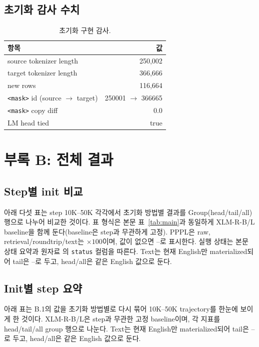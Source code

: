 \documentclass[11pt,a4paper]{article}
\begin{document}
\subsection{초기화 감사 수치}
\begin{table}[h]\centering\small
\caption{초기화 구현 감사.}
\label{tab:audit}
\begin{tabular}{@{}lr@{}}
\toprule
항목 & 값 \\
\midrule
source tokenizer length & 250{,}002 \\
target tokenizer length & 366{,}666 \\
new rows & 116{,}664 \\
\verb|<mask>| id (source $\to$ target) & 250001 $\to$ 366665 \\
\verb|<mask>| copy diff & 0.0 \\
LM head tied & true \\
\bottomrule
\end{tabular}
\end{table}

\section{부록 B: 전체 결과}

\subsection{Step별 init 비교}
아래 다섯 표는 step 10K--50K 각각에서 초기화 방법별 결과를 Group(head/tail/all) 행으로 나누어 비교한 것이다. 표 형식은 본문 표~\ref{tab:main}과 동일하게 XLM-R-B/L baseline을 함께 둔다(baseline은 step과 무관하게 고정). PPPL은 raw, retrieval/roundtrip/text는 $\times100$이며, 값이 없으면 --로 표시한다. 실행 상태는 본문 상태 요약과 원자료 의 \texttt{status} 컬럼을 따른다. Text는 현재 English만 materialized되어 tail은 --로 두고, head/all은 같은 English 값으로 둔다.



\clearpage
\subsection{Init별 step 요약}
아래 표는 B.1의 값을 초기화 방법별로 다시 묶어 10K--50K trajectory를 한눈에 보이게 한 것이다. XLM-R-B/L은 step과 무관한 고정 baseline이며, 각 지표를 head/tail/all group 행으로 나눈다. Text는 현재 English만 materialized되어 tail은 --로 두고, head/all은 같은 English 값으로 둔다.
\end{document}
